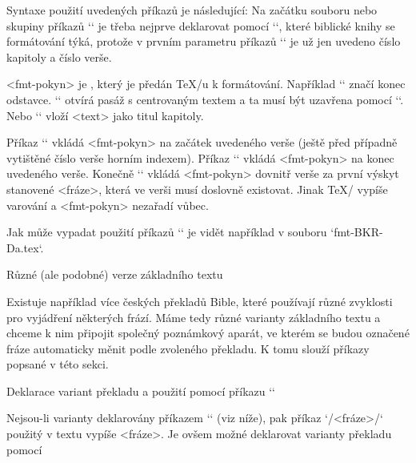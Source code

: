 Syntaxe použití uvedených příkazů je následující:
\begtt
{}
\endtt
Na začátku souboru nebo skupiny
příkazů `\fmt*` je třeba nejprve deklarovat pomocí `\FormatedBook`, které
biblické knihy se formátování týká, protože v prvním parametru příkazů `\fmt*` je už
jen uvedeno číslo kapitoly a číslo verše. 

<fmt-pokyn> je , který je předán \TeX/u k formátování.
\mnote{\code{\\endgraf} \code{\\begcenter} \code{\\endcenter}}
Například `\endgraf` značí konec odstavce. `\begcenter` otvírá pasáž s
centrovaným textem a ta musí být uzavřena pomocí `\endcenter`. Nebo 
`` vloží <text> jako titul kapitoly.

\mnote{\code{\\fmtadd} \code{\\fmtpre} \code{\\fmtins}}
Příkaz `\fmtpre` vkládá <fmt-pokyn>
na začátek uvedeného verše (ještě před případně vytištěné číslo verše horním
indexem). Příkaz `\fmtadd` vkládá <fmt-pokyn> na konec uvedeného verše.
Konečně `\fmtins` vkládá <fmt-pokyn> dovnitř verše za první výskyt stanovené
<fráze>, která ve verši musí doslovně existovat. Jinak \TeX/ vypíše varování
a <fmt-pokyn> nezařadí vůbec.

Jak může vypadat použití příkazů `\fmt*` je vidět například v souboru
`fmt-BKR-Da.tex`.


 Různé (ale podobné) verze základního textu

Existuje například více českých překladů Bible, které používají různé zvyklosti pro
vyjádření některých frází. Máme tedy různé varianty základního textu a
chceme k nim připojit společný poznámkový aparát, ve kterém se budou
označené fráze automaticky měnit podle zvoleného překladu. K tomu slouží příkazy
popsané v této sekci.

\secc Deklarace variant překladu a použití pomocí příkazu `\x`

\mnote{\code{\\vdef} \code{\\x}}
Nejsou-li varianty deklarovány příkazem `\vdef` (viz níže), pak
příkaz `\x/<fráze>/` použitý v textu vypíše <fráze>. Je ovšem možné
deklarovat varianty překladu
\mnote{\code{\\variants}}%
pomocí

